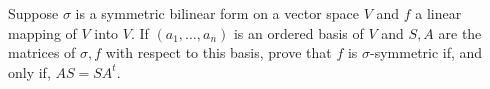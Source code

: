 Suppose $\sigma$ is a symmetric bilinear form on a vector space $V$ and $f$ a linear mapping of $V$ into $V$. If $(a_1, \ldots, a_n)$ is an ordered basis of $V$ and $S, A$ are the matrices of $\sigma, f$ with respect to this basis, prove that $f$ is $\sigma$-symmetric if, and only if, $AS = SA^t$.
